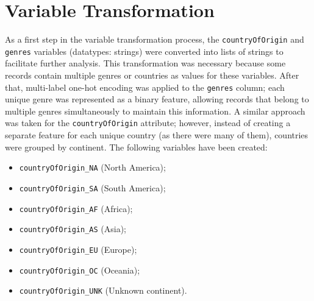 \section{Variable Transformation}\label{sec:var_Transformation}
As a first step in the variable transformation process, the \texttt{countryOfOrigin} and \texttt{genres} variables (datatypes: strings) were converted into 
lists of strings to facilitate further analysis. This transformation was necessary because some records contain multiple genres or countries as values for these variables.
After that, multi-label one-hot encoding was applied to the \texttt{genres} column; each unique genre was represented as a binary feature, 
allowing records that belong to multiple genres simultaneously to maintain this information.
A similar approach was taken for the \texttt{countryOfOrigin} attribute; however, instead of creating a separate feature for each unique country 
(as there were many of them), countries were grouped by continent.
The following variables have been created: 
\begin{multicols}{2}
\begin{itemize}
    \item \texttt{countryOfOrigin\_NA} (North America);
    \item \texttt{countryOfOrigin\_SA} (South America);
    \item \texttt{countryOfOrigin\_AF} (Africa);
    \item \texttt{countryOfOrigin\_AS} (Asia);
    \item \texttt{countryOfOrigin\_EU} (Europe);
    \item \texttt{countryOfOrigin\_OC} (Oceania);
    \item \texttt{countryOfOrigin\_UNK} (Unknown continent).
\end{itemize}
\end{multicols}
